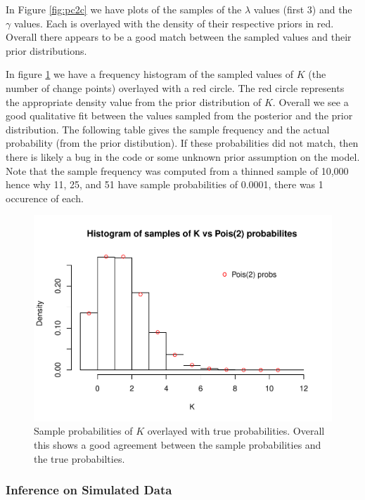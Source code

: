 \documentclass[11pt,a4paper]{article}
\numberwithin{equation}{section}
\begin{document}
In Figure \ref{fig:pc2c} we have plots of the samples of the \(\lambda\)
values (first 3) and the \(\gamma\) values. Each is overlayed with the
density of their respective priors in red. Overall there appears to be a
good match between the sampled values and their prior distributions.

In figure \ref{fig:pois_hist} we have a frequency histogram of the
sampled values of \(K\) (the number of change points) overlayed with a
red circle. The red circle represents the appropriate density value from
the prior distribution of \(K\). Overall we see a good qualitative fit
between the values sampled from the posterior and the prior
distribution. The following table gives the sample frequency and the
actual probability (from the prior distibution). If these probabilities
did not match, then there is likely a bug in the code or some unknown
prior assumption on the model. Note that the sample frequency was
computed from a thinned sample of 10,000 hence why 11, 25, and 51 have
sample probabilities of 0.0001, there was 1 occurence of each.

\begin{figure}
\centering
\includegraphics{thesis_draft_files/figure-latex/unnamed-chunk-3-1.pdf}
\caption{\label{fig:pois_hist} Sample probabilities of \(K\) overlayed
with true probabilities. Overall this shows a good agreement between the
sample probabilities and the true probabilties.}
\end{figure}

\hypertarget{inference-on-simulated-data}{%
\subsubsection{Inference on Simulated
Data}\label{inference-on-simulated-data}}
\end{document}
